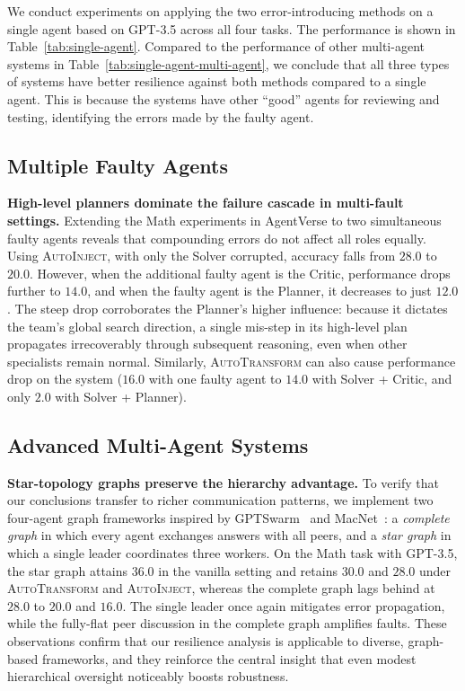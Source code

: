\documentclass{article}
\theoremstyle{plain}
\theoremstyle{definition}
\theoremstyle{remark}
\begin{document}
We conduct experiments on applying the two error-introducing methods on a single agent based on GPT-3.5 across all four tasks.
The performance is shown in Table~\ref{tab:single-agent}.
Compared to the performance of other multi-agent systems in Table~\ref{tab:single-agent-multi-agent}, we conclude that all three types of systems have better resilience against both methods compared to a single agent.
This is because the systems have other ``good'' agents for reviewing and testing, identifying the errors made by the faulty agent.

\subsection{Multiple Faulty Agents}

\textbf{High-level planners dominate the failure cascade in multi-fault settings.}
Extending the Math experiments in AgentVerse to two simultaneous faulty agents reveals that compounding errors do not affect all roles equally.
Using \textsc{AutoInject}, with only the Solver corrupted, accuracy falls from $28.0$ to $20.0$.
However, when the additional faulty agent is the Critic, performance drops further to $14.0$, and when the faulty agent is the Planner, it decreases to just $12.0$.
The steep drop corroborates the Planner's higher influence: because it dictates the team's global search direction, a single mis-step in its high-level plan propagates irrecoverably through subsequent reasoning, even when other specialists remain normal.
Similarly, \textsc{AutoTransform} can also cause performance drop on the system ($16.0$ with one faulty agent to $14.0$ with Solver + Critic, and only $2.0$ with Solver + Planner).

\subsection{Advanced Multi-Agent Systems}

\textbf{Star-topology graphs preserve the hierarchy advantage.}
To verify that our conclusions transfer to richer communication patterns, we implement two four-agent graph frameworks inspired by GPTSwarm~\cite{zhuge2024gptswarm} and MacNet~\cite{qian2024scaling}: a \textit{complete graph} in which every agent exchanges answers with all peers, and a \textit{star graph} in which a single leader coordinates three workers.
On the Math task with GPT-3.5, the star graph attains $36.0$ in the vanilla setting and retains $30.0$ and $28.0$ under \textsc{AutoTransform} and \textsc{AutoInject}, whereas the complete graph lags behind at $28.0$ to $20.0$ and $16.0$.
The single leader once again mitigates error propagation, while the fully-flat peer discussion in the complete graph amplifies faults.
These observations confirm that our resilience analysis is applicable to diverse, graph-based frameworks, and they reinforce the central insight that even modest hierarchical oversight noticeably boosts robustness.
\end{document}
